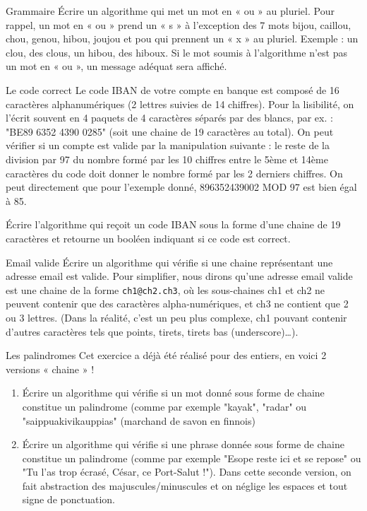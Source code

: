 \begin{Exercice}{Grammaire}
	Écrire un algorithme 
	qui met un mot en « ou » au pluriel. 
	Pour rappel, 
	un mot en « ou » prend un « s » à l'exception des 7 mots 
	bijou, caillou, chou, genou, hibou, joujou et pou qui prennent 
	un « x » au pluriel. 
	Exemple : un clou, des clous, un hibou, des hiboux. 
	Si le mot soumis à l'algorithme n'est pas un mot en « ou », 
	un message adéquat sera affiché.
\end{Exercice}

\begin{Exercice}{Le code correct}
	Le code IBAN de votre compte en banque 
	est composé de 16 caractères alphanumériques 
	(2 lettres suivies de 14 chiffres). 
	Pour la lisibilité, 
	on l'écrit souvent en 4 paquets de 4 caractères 
	séparés par des blancs, par ex. : "BE89 6352 4390 0285" 
	(soit une chaine de 19 caractères au total). 
	On peut vérifier si un compte est valide par la manipulation suivante :
	le reste de la division par 97 du nombre formé 
	par les 10 chiffres entre le 5ème et 14ème caractères du code 
	doit donner le nombre formé par les 2 derniers chiffres. 
	On peut directement que pour l'exemple donné, 
	896352439002 MOD 97 est bien égal à 85.

	Écrire l'algorithme qui reçoit un code IBAN sous la forme 
	d'une chaine de 19 caractères
	et retourne un booléen indiquant si ce code est correct.
\end{Exercice}

\begin{Exercice}{Email valide}
	Écrire un algorithme 
	qui vérifie si une chaine représentant une adresse email 
	est valide. 
	Pour simplifier, 
	nous dirons qu'une adresse email valide 
	est une chaine de la forme \verb|ch1@ch2.ch3|, 
	où les sous-chaines ch1 et ch2 ne peuvent contenir 
	que des caractères alpha-numériques, 
	et ch3 ne contient que 2 ou 3 lettres. 
	(Dans la réalité, c'est un peu plus complexe, 
	ch1 pouvant contenir d'autres caractères 
	tels que points, tirets, tirets bas (underscore)\dots).
\end{Exercice}

\begin{Exercice}{Les palindromes}
	Cet exercice a déjà été réalisé pour des entiers, 
	en voici 2 versions « chaine » ! 
	\begin{enumerate}[label=\alph*)]
	\item 
		Écrire un algorithme qui vérifie 
		si un mot donné sous forme de chaine 
		constitue un palindrome 
		(comme par exemple "kayak", "radar" ou "saippuakivikauppias" 
		(marchand de savon en finnois)
	\item
		Écrire un algorithme qui vérifie 
		si une phrase donnée sous forme de chaine constitue un palindrome 
		(comme par exemple "Esope reste ici et se repose" 
		ou "Tu l'as trop écrasé, César, ce Port-Salut !"). 
		Dans cette seconde version, 
		on fait abstraction des majuscules/minuscules 
		et on néglige les espaces et tout signe de ponctuation.
	\end{enumerate}
\end{Exercice}

